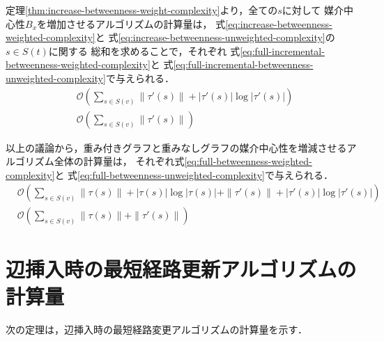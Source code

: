 定理\ref{thm:increase-betweenness-weight-complexity}より，全ての$s$に対して
媒介中心性$B_x$を増加させるアルゴリズムの計算量は，
式\eqref{eq:increase-betweenness-weighted-complexity}と
式\eqref{eq:increase-betweenness-unweighted-complexity}の$s\in S(t)$に関する
総和を求めることで，それぞれ
式\eqref{eq:full-incremental-betweenness-weighted-complexity}と
式\eqref{eq:full-incremental-betweenness-unweighted-complexity}で与えられる．
\begin{align}
  &\mathcal{O}\left(\sum_{s\in S(v)}\|\tau'(s)\|+|\tau'(s)|\log|\tau'(s)|\right)
  \label{eq:full-incremental-betweenness-weighted-complexity} \\
  &\mathcal{O}\left(\sum_{s\in S(v)}\|\tau'(s)\|\right)
  \label{eq:full-incremental-betweenness-unweighted-complexity}
\end{align}

以上の議論から，重み付きグラフと重みなしグラフの媒介中心性を増減させるアルゴリズム全体の計算量は，
それぞれ式\eqref{eq:full-betweenness-weighted-complexity}と
式\eqref{eq:full-betweenness-unweighted-complexity}で与えられる．
\begin{align}
  &\mathcal{O}\left(\sum_{s\in S(v)}\|\tau(s)\|+|\tau(s)|\log|\tau(s)|+\|\tau'(s)\|+|\tau'(s)|\log|\tau'(s)|\right)
  \label{eq:full-betweenness-weighted-complexity} \\
  &\mathcal{O}\left(\sum_{s\in S(v)}\|\tau(s)\|+\|\tau'(s)\|\right)
  \label{eq:full-betweenness-unweighted-complexity}
\end{align}

\section{辺挿入時の最短経路更新アルゴリズムの計算量}
次の定理は，辺挿入時の最短経路変更アルゴリズムの計算量を示す．

